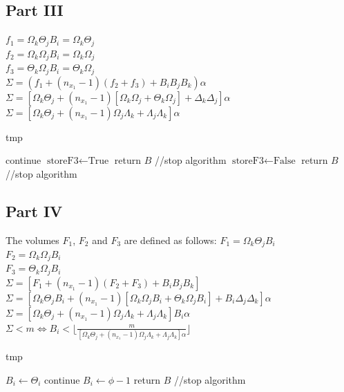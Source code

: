 \documentclass[conference]{IEEEtran}
\begin{document}
  \subsection{Part III}
  \noindent $f_1 = \Omega_k \Theta_j B_i = \Omega_k \Theta_j $ \\
  $f_2 = \Omega_k \Omega_j B_i = \Omega_k \Omega_j $ \\
  $f_3 = \Theta_k \Omega_j B_i = \Theta_k \Omega_j $ \\

  \noindent $\Sigma = (f_1 + (n_{x_1} - 1)(f_2 + f_3) + B_iB_jB_k)\alpha$
  $\Sigma = [ \Omega_k\Theta_j + (n_{x_1} - 1)[\Omega_k \Omega_j + \Theta_k \Omega_j] + \Delta_k\Delta_j]\alpha$ \\
  $\Sigma = [\Omega_k\Theta_j + (n_{x_1}-1)\Omega_j\Lambda_k + \Lambda_j\Lambda_k]\alpha$

  \begin{algorithm}[h]
    \caption{tmp}
    \begin{algorithmic}[1]
      \STATE continue
      \STATE $\textrm{storeF3} \leftarrow \textrm{True}$
      \STATE return $B$ //stop algorithm
    \ELSE
      \STATE $\textrm{storeF3} \leftarrow \textrm{False}$
      \STATE return $B$ //stop algorithm
    \ENDIF
    \end{algorithmic}
  \end{algorithm}

  \subsection{Part IV}
  The volumes $F_1$, $F_2$ and $F_3$ are defined as follows:
  \noindent $F_1 = \Omega_k \Theta_j B_i$ \\
  $F_2 = \Omega_k \Omega_j B_i$ \\
  $F_3 = \Theta_k \Omega_j B_i$ \\

  \noindent $\Sigma = [ F_1 + (n_{x_1} - 1)(F_2 + F_3) + B_iB_jB_k ]$ \\
  $\Sigma = [\Omega_k\Theta_jB_i + (n_{x_1} - 1)[\Omega_k\Omega_jB_i + \Theta_k\Omega_jB_i] + B_i\Delta_j\Delta_k]\alpha$ \\
  $\Sigma = [\Omega_k\Theta_j + (n_{x_1}-1)\Omega_j\Lambda_k + \Lambda_j\Lambda_k]B_i\alpha$ \\
  $\Sigma < m \Leftrightarrow B_i < \lfloor \frac{m}{[\Omega_k\Theta_j + (n_{x_1}-1)\Omega_j\Lambda_k + \Lambda_j\Lambda_k]\alpha} \rfloor$

  \begin{algorithm}[h]
    \caption{tmp}
    \begin{algorithmic}[1]
      \STATE $B_i \leftarrow \Theta_i$
      \STATE continue
    \ELSE
      \STATE $B_i \leftarrow \phi - 1$
      \STATE return $B$ //stop algorithm
    \ENDIF
    \end{algorithmic}
  \end{algorithm}
\end{document}
